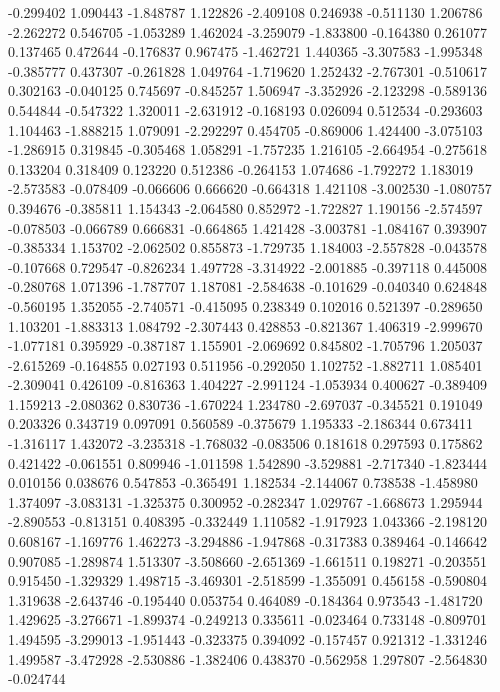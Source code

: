 -0.299402
1.090443
-1.848787
1.122826
-2.409108
0.246938
-0.511130
1.206786
-2.262272
0.546705
-1.053289
1.462024
-3.259079
-1.833800
-0.164380
0.261077
0.137465
0.472644
-0.176837
0.967475
-1.462721
1.440365
-3.307583
-1.995348
-0.385777
0.437307
-0.261828
1.049764
-1.719620
1.252432
-2.767301
-0.510617
0.302163
-0.040125
0.745697
-0.845257
1.506947
-3.352926
-2.123298
-0.589136
0.544844
-0.547322
1.320011
-2.631912
-0.168193
0.026094
0.512534
-0.293603
1.104463
-1.888215
1.079091
-2.292297
0.454705
-0.869006
1.424400
-3.075103
-1.286915
0.319845
-0.305468
1.058291
-1.757235
1.216105
-2.664954
-0.275618
0.133204
0.318409
0.123220
0.512386
-0.264153
1.074686
-1.792272
1.183019
-2.573583
-0.078409
-0.066606
0.666620
-0.664318
1.421108
-3.002530
-1.080757
0.394676
-0.385811
1.154343
-2.064580
0.852972
-1.722827
1.190156
-2.574597
-0.078503
-0.066789
0.666831
-0.664865
1.421428
-3.003781
-1.084167
0.393907
-0.385334
1.153702
-2.062502
0.855873
-1.729735
1.184003
-2.557828
-0.043578
-0.107668
0.729547
-0.826234
1.497728
-3.314922
-2.001885
-0.397118
0.445008
-0.280768
1.071396
-1.787707
1.187081
-2.584638
-0.101629
-0.040340
0.624848
-0.560195
1.352055
-2.740571
-0.415095
0.238349
0.102016
0.521397
-0.289650
1.103201
-1.883313
1.084792
-2.307443
0.428853
-0.821367
1.406319
-2.999670
-1.077181
0.395929
-0.387187
1.155901
-2.069692
0.845802
-1.705796
1.205037
-2.615269
-0.164855
0.027193
0.511956
-0.292050
1.102752
-1.882711
1.085401
-2.309041
0.426109
-0.816363
1.404227
-2.991124
-1.053934
0.400627
-0.389409
1.159213
-2.080362
0.830736
-1.670224
1.234780
-2.697037
-0.345521
0.191049
0.203326
0.343719
0.097091
0.560589
-0.375679
1.195333
-2.186344
0.673411
-1.316117
1.432072
-3.235318
-1.768032
-0.083506
0.181618
0.297593
0.175862
0.421422
-0.061551
0.809946
-1.011598
1.542890
-3.529881
-2.717340
-1.823444
0.010156
0.038676
0.547853
-0.365491
1.182534
-2.144067
0.738538
-1.458980
1.374097
-3.083131
-1.325375
0.300952
-0.282347
1.029767
-1.668673
1.295944
-2.890553
-0.813151
0.408395
-0.332449
1.110582
-1.917923
1.043366
-2.198120
0.608167
-1.169776
1.462273
-3.294886
-1.947868
-0.317383
0.389464
-0.146642
0.907085
-1.289874
1.513307
-3.508660
-2.651369
-1.661511
0.198271
-0.203551
0.915450
-1.329329
1.498715
-3.469301
-2.518599
-1.355091
0.456158
-0.590804
1.319638
-2.643746
-0.195440
0.053754
0.464089
-0.184364
0.973543
-1.481720
1.429625
-3.276671
-1.899374
-0.249213
0.335611
-0.023464
0.733148
-0.809701
1.494595
-3.299013
-1.951443
-0.323375
0.394092
-0.157457
0.921312
-1.331246
1.499587
-3.472928
-2.530886
-1.382406
0.438370
-0.562958
1.297807
-2.564830
-0.024744
